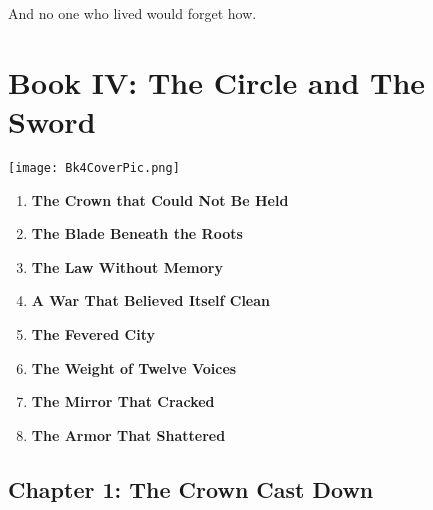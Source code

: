 \documentclass[12pt]{article}
\begin{document}
And no one who lived would forget how.




\newpage

\section*{Book IV: The Circle and The Sword}

\vspace{.15in}

\begin{center}
    \texttt{[image: Bk4CoverPic.png]}
\end{center}

\vspace{.15in}

\begin{enumerate}
    \item \textbf{The Crown that Could Not Be Held} 

    \vspace{1pt}
    \item \textbf{The Blade Beneath the Roots} 

    \vspace{1pt}
    \item \textbf{The Law Without Memory} 

    \vspace{1pt}
    \item \textbf{A War That Believed Itself Clean} 

    \vspace{1pt}
    \item \textbf{The Fevered City} 

    \vspace{1pt}
    \item \textbf{The Weight of Twelve Voices}

    \vspace{1pt}
    \item \textbf{The Mirror That Cracked} 

    \vspace{1pt}
    \item \textbf{The Armor That Shattered} 

\end{enumerate}

\newpage

\subsection{Chapter 1: The Crown Cast Down}
\end{document}

